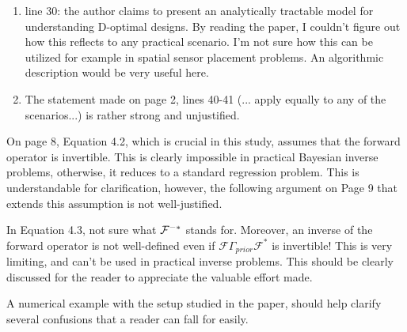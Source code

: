 \documentclass{amsart}
\begin{document}
\begin{enumerate}
\item line 30: the author claims to present an analytically tractable
  model for understanding D-optimal designs. By reading the paper, I
  couldn't figure out how this reflects to any practical scenario. I'm
  not sure how this can be utilized for example in spatial sensor
  placement problems. An algorithmic description would be very useful
  here.

\item The statement made on page 2, lines 40-41 (... apply equally to
  any of the scenarios...) is rather strong and unjustified.
\end{enumerate}

On page 8, Equation 4.2, which is crucial in this study, assumes that
the forward operator is invertible. This is clearly impossible in
practical Bayesian inverse problems, otherwise, it reduces to a
standard regression problem. This is understandable for clarification,
however, the following argument on Page 9 that extends this assumption
is not well-justified.


In Equation 4.3, not sure what $\mathcal{F}^{-*}$ stands for. Moreover, an
inverse of the forward operator is not well-defined even if
$\mathcal{F}\Gamma_{prior}\mathcal{F}^*$ is invertible! This is very
limiting, and can't be used in practical inverse problems. This should
be clearly discussed for the reader to appreciate the valuable effort
made.


A numerical example with the setup studied in the paper, should help
clarify several confusions that a reader can fall for easily.
\end{document}
